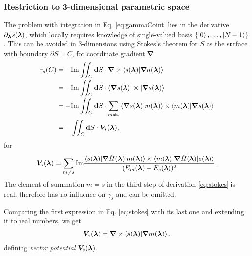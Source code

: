 \subsubsection{Restriction to 3-dimensional parametric space}
The problem with integration in Eq. \ref{eq:gammaCoint} lies in the derivative $\partial_{\bm\lambda} s({\bm\lambda})$, which locally requires knowledge of single-valued basis $\{\ket{0},\dots, \ket{N-1}\}$. This can be avoided in 3-dimensions using Stokes's theorem for $S$ as the surface with boundary $\partial S=C$, for coordinate gradient $\bm \nabla$
\begin{equation}
    \begin{split}
        \gamma_s(C) &= -\textrm{Im} \iint_C \bm{\mathrm{d}} S \cdot \bm \nabla \times \braket{s({\bm\lambda})|\bm \nabla n({\bm\lambda})}\\
         &= -\textrm{Im} \iint_C \bm{\mathrm{d}} S \cdot \braket{\bm \nabla s({\bm\lambda})|\times|\bm \nabla s({\bm\lambda})}\\
        &= -\textrm{Im} \iint_C \bm{\mathrm{d}} S \cdot \sum_{m\neq s} \braket{\bm \nabla s({\bm\lambda})|m({\bm\lambda})}\times \braket{m({\bm\lambda})|\bm \nabla s({\bm\lambda})}\\
        &= -\iint_C \bm{\mathrm{d}} S \cdot \bm V_s({\bm\lambda}),
    \end{split}
    \label{eq:stokes}
\end{equation}
for 
\begin{equation}
    \bm V_s({\bm\lambda}) = \sum_{m\neq s} \textrm{Im} \frac{
            \braket{s({\bm\lambda})|\bm \nabla\hat{H}({\bm\lambda}) |m({\bm\lambda})}\times \braket{m({\bm\lambda})|\bm \nabla\hat{H}({\bm\lambda})|s({\bm\lambda})}    
             }{
(E_m({\bm\lambda})-E_s({\bm\lambda}))^2
             }.
\end{equation}
The element of summation $m=s$ in the third step of derivation \ref{eq:stokes} is real, therefore has no influence on $\gamma_s$ and can be omitted. 

Comparing the first expression in Eq. \ref{eq:stokes} with its last one and extending it to real numbers, we get
\begin{equation}
    \bm V_s({\bm\lambda})=\bm \nabla\times\braket{s({\bm\lambda})|\bm \nabla m({\bm\lambda})}, 
    \label{eq:vectorPotentialDef}  
\end{equation}
defining \emph{vector potential} $\bm V_s({\bm\lambda})$.

